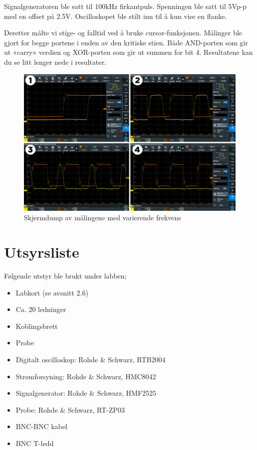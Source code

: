 \documentclass{article}
\begin{document}
Signalgeneratoren ble satt til 100kHz firkantpuls. Spenningen ble satt til 5Vp-p med en offset på 2.5V.  Oscilloskopet ble stilt inn til å kun vise en flanke.

Deretter målte vi stige- og falltid ved å bruke cursor-funksjonen. Målinger ble gjort for begge portene i enden av den kritiske stien. Både AND-porten som gir ut «carry» verdien og XOR-porten som gir ut summen for bit 4. Resultatene kan du se litt lenger nede i resultater.

\begin{figure}[t]
	\centering
	\includegraphics[width=1\linewidth]{tegneserie1}
	\caption{Skjermdump av målingene med varierende frekvens}
	\label{fig:tegneserie1}
\end{figure}


\section{Utsyrsliste}
Følgende utstyr ble brukt under labben;
\begin{itemize}
	\item Labkort (se avsnitt 2.6)
	\item Ca. 20 ledninger
	\item Koblingsbrett
	\item Probe
	\item Digitalt oscilloskop: Rohde \& Schwarz, RTB2004
	\item Strømforsyning: Rohde \& Schwarz, HMC8042
	\item Signalgenerator: Rohde \& Schwarz, HMF2525
	\item Probe: Rohde \& Schwarz, RT-ZP03
	\item BNC-BNC kabel
	\item BNC T-ledd
\end{itemize}
\end{document}
